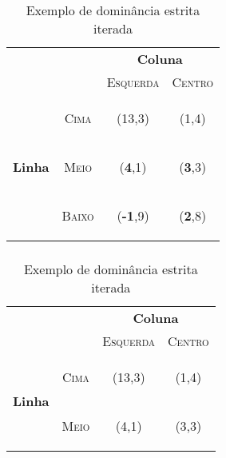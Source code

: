 \begin{frame}
\frametitle{\subsubsecname}
\begin{table}[ht]
\centering
\begin{tabular}{|c|c|c|c|}
\cline{3-4}
\multicolumn{1}{c}{} &  & \multicolumn{2}{c|}{\textbf{Coluna}}\tabularnewline
\cline{3-4}
\multicolumn{1}{c}{} &  & \textsc{Esquerda} & \textsc{Centro}\tabularnewline
\hline
\multirow{3}{*}{\begin{turn}{90}
\textbf{Linha}
\end{turn}} & \begin{turn}{90}
\textsc{Cima}
\end{turn} & {\Large(13,3)} & {\Large(1,4)} \tabularnewline
\cline{2-4}
 & \begin{turn}{90}
\textsc{Meio}
\end{turn} & {\Large(\textbf{4},1)} & {\Large(\textbf{3},3)} \tabularnewline
\cline{2-4}
 & \begin{turn}{90}
\textsc{Baixo}
\end{turn} &  {\Large(\textbf{-1},9)} & {\Large(\textbf{2},8)} \tabularnewline
\hline
\end{tabular}
\caption{Exemplo de dominância estrita iterada}
\label{tab:dominancia-estrita-iterada}
\end{table}
\end{frame}

\begin{frame}
\frametitle{\subsubsecname}
\begin{table}[ht]
\centering
\begin{tabular}{|c|c|c|c|}
\cline{3-4}
\multicolumn{1}{c}{} &  & \multicolumn{2}{c|}{\textbf{Coluna}}\tabularnewline
\cline{3-4}
\multicolumn{1}{c}{} &  & \textsc{Esquerda} & \textsc{Centro}\tabularnewline
\hline
\multirow{2}{*}{\begin{turn}{90}
\textbf{Linha}
\end{turn}} & \begin{turn}{90}
\textsc{Cima}
\end{turn} & {\Large(13,3)} & {\Large(1,4)} \tabularnewline
\cline{2-4}
 & \begin{turn}{90}
\textsc{Meio}
\end{turn} & {\Large(4,1)} & {\Large(3,3)} \tabularnewline
\hline
\end{tabular}
\caption{Exemplo de dominância estrita iterada}
\label{tab:dominancia-estrita-iterada}
\end{table}
\end{frame}

